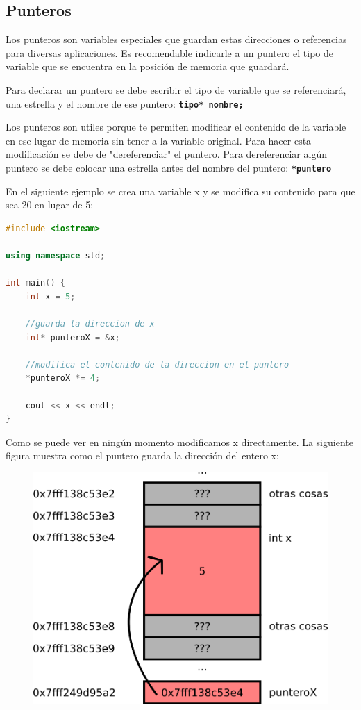\documentclass{article}
\begin{document}
\subsection{Punteros}

Los punteros son variables especiales que guardan estas direcciones o referencias para diversas aplicaciones. Es recomendable indicarle a un puntero el tipo de variable que se encuentra en la posición de memoria que guardará.

Para declarar un puntero se debe escribir el tipo de variable que se referenciará, una estrella y el nombre de ese puntero: \textbf{\lstinline{tipo* nombre;}}

Los punteros son utiles porque te permiten modificar el contenido de la variable en ese lugar de memoria sin tener a la variable original. Para hacer esta modificación se debe de "dereferenciar" el puntero. Para dereferenciar algún puntero se debe colocar una estrella antes del nombre del puntero: \textbf{\lstinline{*puntero}}

En el siguiente ejemplo se crea una variable x y se modifica su contenido para que sea 20 en lugar de 5:

\begin{lstlisting}[language=C++, title=Referencias]
#include <iostream>

using namespace std;

int main() {
	int x = 5;

	//guarda la direccion de x
	int* punteroX = &x;

	//modifica el contenido de la direccion en el puntero
	*punteroX *= 4;

	cout << x << endl;
}
\end{lstlisting}

Como se puede ver en ningún momento modificamos x directamente. La siguiente figura muestra como el puntero guarda la dirección del entero x:

\begin{figure}[H]
    \centering
    \includegraphics[width=0.4\paperwidth]{puntero}
\end{figure}
\end{document}
